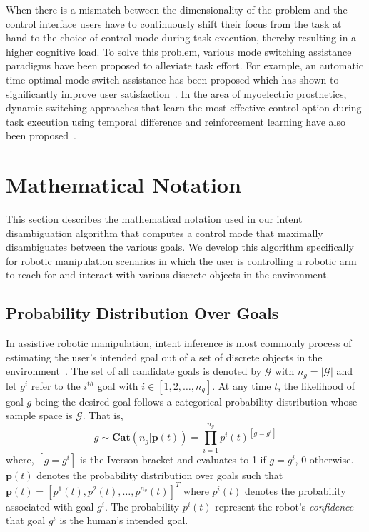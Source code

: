 \documentclass[conference]{IEEEtran}
\begin{document}
When there is a mismatch between the dimensionality of the problem and the control interface users have to continuously shift their focus from the task at hand to the choice of control mode during task execution, thereby resulting in a higher cognitive load. To solve this problem, various mode switching assistance paradigms have been proposed to alleviate task effort. For example, an automatic time-optimal mode switch assistance has been proposed which has shown to significantly improve user satisfaction~\citep{herlant2016assistive}. In the area of myoelectric prosthetics, dynamic switching approaches that learn the most effective control option during task execution using temporal difference and reinforcement learning have also been proposed~\cite{pilarski2012dynamic}. 


\section{Mathematical Notation}\label{sec:math}
This section describes the mathematical notation used in our intent disambiguation algorithm that computes a control mode that maximally disambiguates between the various goals.
We develop this algorithm specifically for robotic manipulation scenarios in which the user is controlling a robotic arm to reach for and interact with various discrete objects in the environment.

\subsection{Probability Distribution Over Goals}\label{ssec:notation}
 In assistive robotic manipulation, intent inference is most commonly process of estimating the user's intended goal out of a set of discrete objects in the environment~\citep{calli2015ycb}. The set of all candidate goals is denoted by $\mathcal{G}$ with $n_g = \vert\mathcal{G}\vert$ and let $g^i$ refer to the $i^{th}$ goal with $i \in [1,2,\dots, n_g]$. At any time $t$, the likelihood of goal $g$ being the desired goal follows a categorical probability distribution whose sample space is $\mathcal{G}$. 
 That is, 
 \begin{equation*}
 g \sim \textbf{Cat}(n_g | \boldsymbol{p}(t)) = \prod_{i=1}^{n_g}p^{i}(t)^{[g = g^i]}
 \end{equation*}
where, $[g = g^i]$ is the Iverson bracket and evaluates to 1 if $g = g^i$, 0 otherwise. $\boldsymbol{p}(t)$ denotes the probability distribution over goals such that $\boldsymbol{p}(t) = [p^1(t), p^2(t),\dots, p^{n_g}(t)]^{T}$ where $p^i(t)$ denotes the probability associated with goal $g^i$.  The probability $p^i(t)$ represent the robot's \textit{confidence} that goal $g^i$ is the human's intended goal. 
\end{document}
